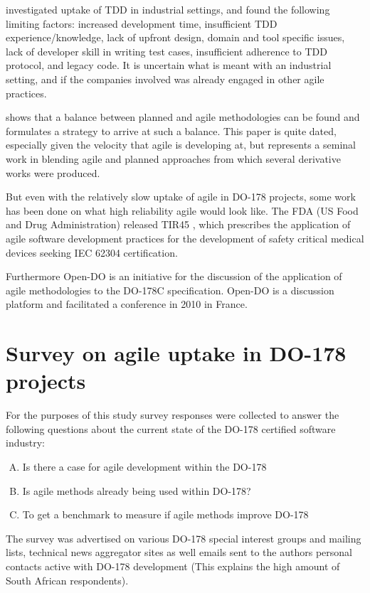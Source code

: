 \documentclass[conference]{IEEEtran}
\begin{document}
\cite{Causevic_2011} investigated uptake of TDD in industrial settings, and found the following limiting factors: increased development time, insufficient TDD experience/knowledge, lack of upfront design, domain and tool specific issues, lack of developer skill in writing test cases, insufficient adherence to TDD protocol, and legacy code. It is uncertain what is meant with an industrial setting, and if the companies involved was already engaged in other agile practices. 
 
\cite{Boehm_2003} shows that a balance between planned and agile methodologies can be found and formulates a strategy to arrive at such a balance. This paper is quite dated, especially given the velocity that agile is developing at, but represents a seminal work in blending agile and planned approaches from which several derivative works were produced. 

But even with the relatively slow uptake of agile in DO-178 projects, some work has been done on what high reliability agile would look like. The FDA (US Food and Drug Administration) released TIR45 \cite{AAMI_TIR45_2012}, which prescribes the application of agile software development practices for the development of safety critical medical devices seeking IEC 62304 certification. 

Furthermore Open-DO \cite{OPEN-DO_2010} is an initiative for the discussion of the application of agile methodologies to the DO-178C specification. Open-DO is a discussion platform and facilitated a conference in 2010 in France.     

\section{Survey on agile uptake in DO-178 projects}
For the purposes of this study survey responses were collected to answer the following questions about the current state of the DO-178 certified software industry:
\begin{enumerate}[A.]
\item Is there a case for agile development within the DO-178 %
\item Is agile methods already being used within DO-178?
\item To get a benchmark to measure if agile methods improve DO-178 %
\end{enumerate} 

The survey was advertised on various DO-178 special interest groups and mailing lists, technical news aggregator sites as well emails sent to the authors personal contacts active with DO-178 development (This explains the high amount of South African respondents).
 
\end{document}
